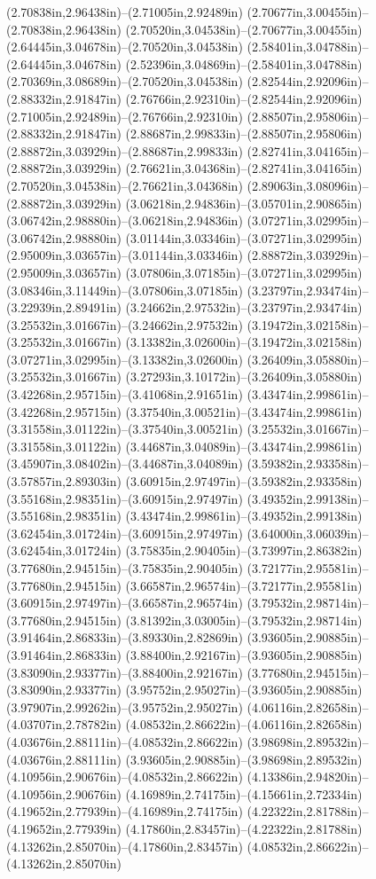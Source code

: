 (2.70838in,2.96438in)--(2.71005in,2.92489in) (2.70677in,3.00455in)--(2.70838in,2.96438in) (2.70520in,3.04538in)--(2.70677in,3.00455in) (2.64445in,3.04678in)--(2.70520in,3.04538in) (2.58401in,3.04788in)--(2.64445in,3.04678in) (2.52396in,3.04869in)--(2.58401in,3.04788in) (2.70369in,3.08689in)--(2.70520in,3.04538in) (2.82544in,2.92096in)--(2.88332in,2.91847in) (2.76766in,2.92310in)--(2.82544in,2.92096in) (2.71005in,2.92489in)--(2.76766in,2.92310in) (2.88507in,2.95806in)--(2.88332in,2.91847in) (2.88687in,2.99833in)--(2.88507in,2.95806in) (2.88872in,3.03929in)--(2.88687in,2.99833in) (2.82741in,3.04165in)--(2.88872in,3.03929in) (2.76621in,3.04368in)--(2.82741in,3.04165in) (2.70520in,3.04538in)--(2.76621in,3.04368in) (2.89063in,3.08096in)--(2.88872in,3.03929in) (3.06218in,2.94836in)--(3.05701in,2.90865in) (3.06742in,2.98880in)--(3.06218in,2.94836in) (3.07271in,3.02995in)--(3.06742in,2.98880in) (3.01144in,3.03346in)--(3.07271in,3.02995in) (2.95009in,3.03657in)--(3.01144in,3.03346in) (2.88872in,3.03929in)--(2.95009in,3.03657in) (3.07806in,3.07185in)--(3.07271in,3.02995in) (3.08346in,3.11449in)--(3.07806in,3.07185in) (3.23797in,2.93474in)--(3.22939in,2.89491in) (3.24662in,2.97532in)--(3.23797in,2.93474in) (3.25532in,3.01667in)--(3.24662in,2.97532in) (3.19472in,3.02158in)--(3.25532in,3.01667in) (3.13382in,3.02600in)--(3.19472in,3.02158in) (3.07271in,3.02995in)--(3.13382in,3.02600in) (3.26409in,3.05880in)--(3.25532in,3.01667in) (3.27293in,3.10172in)--(3.26409in,3.05880in) (3.42268in,2.95715in)--(3.41068in,2.91651in) (3.43474in,2.99861in)--(3.42268in,2.95715in) (3.37540in,3.00521in)--(3.43474in,2.99861in) (3.31558in,3.01122in)--(3.37540in,3.00521in) (3.25532in,3.01667in)--(3.31558in,3.01122in) (3.44687in,3.04089in)--(3.43474in,2.99861in) (3.45907in,3.08402in)--(3.44687in,3.04089in) (3.59382in,2.93358in)--(3.57857in,2.89303in) (3.60915in,2.97497in)--(3.59382in,2.93358in) (3.55168in,2.98351in)--(3.60915in,2.97497in) (3.49352in,2.99138in)--(3.55168in,2.98351in) (3.43474in,2.99861in)--(3.49352in,2.99138in) (3.62454in,3.01724in)--(3.60915in,2.97497in) (3.64000in,3.06039in)--(3.62454in,3.01724in) (3.75835in,2.90405in)--(3.73997in,2.86382in) (3.77680in,2.94515in)--(3.75835in,2.90405in) (3.72177in,2.95581in)--(3.77680in,2.94515in) (3.66587in,2.96574in)--(3.72177in,2.95581in) (3.60915in,2.97497in)--(3.66587in,2.96574in) (3.79532in,2.98714in)--(3.77680in,2.94515in) (3.81392in,3.03005in)--(3.79532in,2.98714in) (3.91464in,2.86833in)--(3.89330in,2.82869in) (3.93605in,2.90885in)--(3.91464in,2.86833in) (3.88400in,2.92167in)--(3.93605in,2.90885in) (3.83090in,2.93377in)--(3.88400in,2.92167in) (3.77680in,2.94515in)--(3.83090in,2.93377in) (3.95752in,2.95027in)--(3.93605in,2.90885in) (3.97907in,2.99262in)--(3.95752in,2.95027in) (4.06116in,2.82658in)--(4.03707in,2.78782in) (4.08532in,2.86622in)--(4.06116in,2.82658in) (4.03676in,2.88111in)--(4.08532in,2.86622in) (3.98698in,2.89532in)--(4.03676in,2.88111in) (3.93605in,2.90885in)--(3.98698in,2.89532in) (4.10956in,2.90676in)--(4.08532in,2.86622in) (4.13386in,2.94820in)--(4.10956in,2.90676in) (4.16989in,2.74175in)--(4.15661in,2.72334in) (4.19652in,2.77939in)--(4.16989in,2.74175in) (4.22322in,2.81788in)--(4.19652in,2.77939in) (4.17860in,2.83457in)--(4.22322in,2.81788in) (4.13262in,2.85070in)--(4.17860in,2.83457in) (4.08532in,2.86622in)--(4.13262in,2.85070in) 